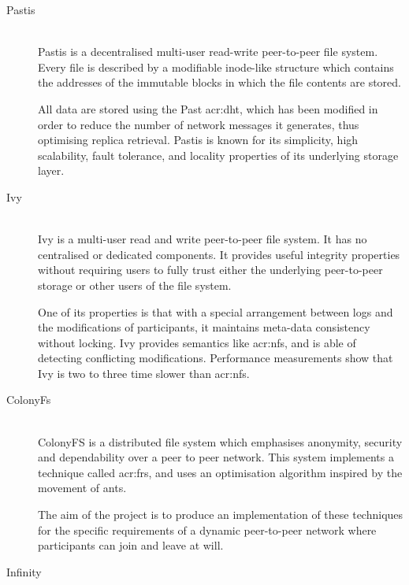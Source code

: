 \begin{description}
	\item[Pastis]\-\\
	Pastis \cite{Busca:2005gt} is a decentralised multi-user read-write peer-to-peer file system. Every file is described by
a modifiable inode-like structure which contains the addresses of the immutable blocks in which the file contents are stored.

All data are stored using the Past \gls{acr:dht}, which has been modified in order to reduce the number of network messages it generates, thus optimising replica retrieval. Pastis is known for its simplicity, high scalability, fault tolerance, and locality properties of its underlying storage layer.
	\item[Ivy]\-\\
	Ivy \cite{Muthitacharoen:2002iv} is a multi-user read and write peer-to-peer file system. It has no centralised or dedicated components. It provides useful integrity properties without requiring users to fully trust either the underlying peer-to-peer storage or other users of the file system.
	
	One of its properties is that with a special arrangement between logs and the modifications of participants, it maintains meta-data consistency without locking. Ivy provides semantics like \gls{acr:nfs}, and is able of detecting conflicting modifications. Performance measurements show that Ivy is two to three time slower than \gls{acr:nfs}.
	\item[ColonyFs]\-\\
	ColonyFS \cite{Colony:2009fs} is a distributed file system which emphasises anonymity, security and dependability over a peer to peer network. This system implements a technique called \gls{acr:frs}, and uses an optimisation algorithm inspired by the movement of ants.
	
	The aim of the project is to produce an implementation of these techniques for the specific requirements of a dynamic peer-to-peer network where participants can join and leave at will.
	\item[Infinity]\-\\
	
\end{description}
